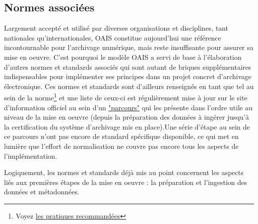 \documentclass[12pt,a4paper]{article} %
\begin{document}
\subsection{Normes associées}
Largement accepté et utilisé  par diverses organisations et disciplines, tant nationales qu'internationales, OAIS constitue aujourd'hui une référence incontournable pour l'archivage numérique, mais reste insuffisante pour assurer sa mise en oeuvre. C'est pourquoi le modèle OAIS a servi de base à l'élaboration d'autres normes et standards associés qui sont autant de briques supplémentaires indispensables pour implémenter ses principes dans un projet concret d'archivage électronique. Ces normes et standards sont d'ailleurs renseignés en tant que tel au sein de la norme\footnote{Voyez \href{https://public.ccsds.org/Pubs/650x0m2(F).pdf}{les pratiques recommandées}} et une liste de ceux-ci est régulièrement mise à jour sur le site d'information officiel au sein d'un \href{http://www.oais.info/standards-process/oais-roadmap-and-related-standards/}{"parcours"} qui les présente dans l'ordre utile au niveau de la mise en oeuvre (depuis la préparation des données à ingérer jusqu'à la certification du système d'archivage mis en place).Une série d'étape au sein de ce parcours n'ont pas encore de standard spécifique disponible, ce qui met en lumière que l'effort de normalisation ne couvre pas encore tous les aspects de l'implémentation.

Logiquement, les normes et standards déjà mis au point concernent les aspects liés aux premières étapes de la mise en oeuvre : la préparation et l'ingestion des données et métadonnées. 
\end{document}
